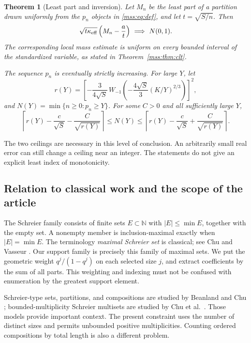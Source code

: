 \documentclass[11pt,letterpaper]{article}
\numberwithin{equation}{section}
\newtheorem{theorem}{Theorem}[section]
\theoremstyle{definition}\newtheorem{definition}[theorem]{Definition}
\theoremstyle{remark}\newtheorem{remark}[theorem]{Remark}
\newcommand{\N}{\mathbb N}
\begin{document}
\begin{theorem}[Least part and inversion]\label{mss:thm:consequences}
Let $M_n$ be the least part of a partition drawn uniformly from the $p_n$ objects in \eqref{mss:eq:def}, and let $t=\sqrt{S/n}$. Then
\begin{equation}\label{mss:eq:cltintro}
\sqrt{t\kappa_{\rm eff}}\left(M_n-\frac a t\right)
\ \Longrightarrow\ N(0,1).
\end{equation}
The corresponding local mass estimate is uniform on every bounded interval of the standardized variable, as stated in Theorem~\ref{mss:thm:clt}.

The sequence $p_n$ is eventually strictly increasing. For large $Y$, let
\begin{equation}\label{mss:eq:rintro}
r(Y)=\left[-\frac3{4\sqrt S}\,
W_{-1}\!\left(-\frac{4\sqrt S}{3}(K/Y)^{2/3}\right)\right]^2,
\end{equation}
and $N(Y)=\min\{n\ge0:p_n\ge Y\}$. For some $C>0$ and all sufficiently large $Y$,
\begin{equation}\label{mss:eq:inverseintro}
\left\lceil r(Y)-\frac c{\sqrt S}-\frac C{\sqrt{r(Y)}}\right\rceil
\le N(Y)\le
\left\lceil r(Y)-\frac c{\sqrt S}+\frac C{\sqrt{r(Y)}}\right\rceil.
\end{equation}
\end{theorem}
The two ceilings are necessary in this level of conclusion. An arbitrarily small real error can still change a ceiling near an integer. The statements do not give an explicit least index of monotonicity.

\subsection{Relation to classical work and the scope of the article}\label{mss:sec:classical}
The Schreier family consists of finite sets $E\subset\N$ with $|E|\le\min E$, together with the empty set. A nonempty member is inclusion-maximal exactly when $|E|=\min E$. The terminology \emph{maximal Schreier set} is classical; see Chu and Vasseur \cite{chu-vasseur}. Our support family is precisely this family of maximal sets. We put the geometric weight $q^j/(1-q^j)$ on each selected size $j$, and extract coefficients by the sum of all parts. This weighting and indexing must not be confused with enumeration by the greatest support element.

Schreier-type sets, partitions, and compositions are studied by Beanland and Chu \cite{beanland-chu}; bounded-multiplicity Schreier multisets are studied by Chu et al.\ \cite{chu-multisets}. Those models provide important context. The present constraint uses the number of distinct sizes and permits unbounded positive multiplicities. Counting ordered compositions by total length is also a different problem.
\end{document}
